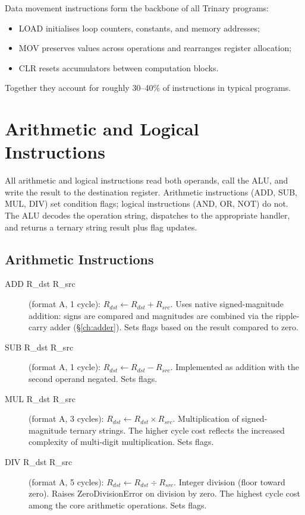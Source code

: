 \documentclass[12pt,a4paper,twoside]{book}
\theoremstyle{trinarytheorem}
\theoremstyle{trinarydefinition}
\newcommand{\code}[1]{\textsf{#1}}
\begin{document}
Data movement instructions form the backbone of all Trinary programs:
\begin{itemize}
    \item LOAD initialises loop counters, constants, and memory addresses;
    \item MOV preserves values across operations and rearranges register allocation;
    \item CLR resets accumulators between computation blocks.
\end{itemize}
Together they account for roughly 30--40\% of instructions in typical programs.

\chapter{Arithmetic and Logical Instructions}
\label{ch:arithlogic}

All arithmetic and logical instructions read both operands, call the ALU, and write
the result to the destination register. Arithmetic instructions (ADD, SUB, MUL, DIV)
set condition flags; logical instructions (AND, OR, NOT) do not. The ALU decodes the
operation string, dispatches to the appropriate handler, and returns a ternary string
result plus flag updates.

\section{Arithmetic Instructions}

\begin{description}
    \item[\code{ADD R\_dst R\_src}] (format A, 1 cycle): $R_{dst} \gets
          R_{dst} + R_{src}$. Uses native signed-magnitude addition: signs are
          compared and magnitudes are combined via the ripple-carry adder
          (\S\ref{ch:adder}). Sets flags based on the result compared to zero.
    \item[\code{SUB R\_dst R\_src}] (format A, 1 cycle): $R_{dst} \gets
          R_{dst} - R_{src}$. Implemented as addition with the second operand
          negated. Sets flags.
    \item[\code{MUL R\_dst R\_src}] (format A, 3 cycles): $R_{dst} \gets
          R_{dst} \times R_{src}$. Multiplication of signed-magnitude ternary strings.
          The higher cycle cost reflects the increased complexity of multi-digit
          multiplication. Sets flags.
    \item[\code{DIV R\_dst R\_src}] (format A, 5 cycles): $R_{dst} \gets
          R_{dst} \div R_{src}$. Integer division (floor toward zero). Raises
          \code{ZeroDivisionError} on division by zero. The highest cycle cost
          among the core arithmetic operations. Sets flags.
\end{description}
\end{document}
